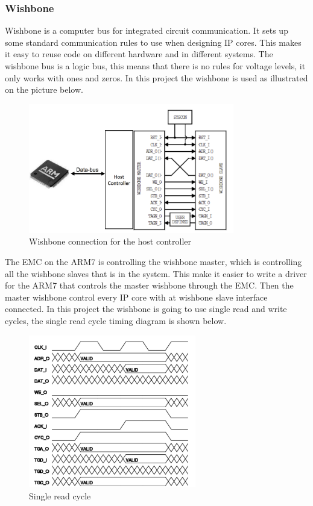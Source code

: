 \subsubsection{Wishbone}
Wishbone is a computer bus for integrated circuit communication. It sets up some standard communication rules to use when designing IP cores. This makes it easy to reuse code on different hardware and in different systems. The wishbone bus is a logic bus, this means that there is no rules for voltage levels, it only works with ones and zeros. In this project the wishbone is used as illustrated on the picture below.
\begin{figure}[H]
	\begin{centering}
		 \includegraphics[width=0.8\textwidth]{content/appendix/eudp/images/typical_usage.png}
		\caption{Wishbone connection for the host controller}
	\end{centering}
\end{figure}
The EMC on the ARM7 is controlling the wishbone master, which is controlling all the wishbone slaves that is in the system. This make it easier to write a driver for the ARM7 that controls the master wishbone through the EMC. Then the master wishbone control every IP core with at wishbone slave interface connected. In this project the wishbone is going to use single read and write cycles, the single read cycle timing diagram is shown below.
\begin{figure}[H]
	\begin{centering}
		 \includegraphics[width=0.65\textwidth]{content/appendix/eudp/images/wb_single_read.png}
		\caption{Single read cycle}
	\end{centering}
\end{figure}
